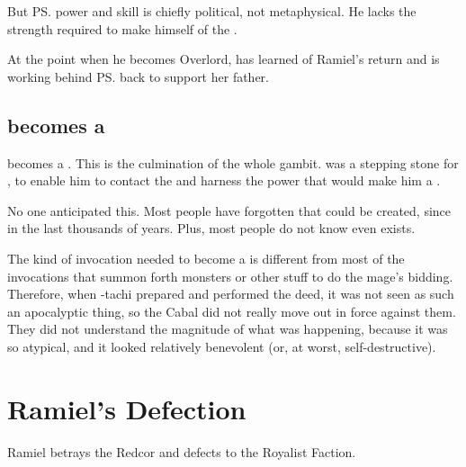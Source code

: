 \begin{garbage}
But \ps{\Dasteron} power and skill is chiefly political, not metaphysical. 
He lacks the \vertex{} strength required to make himself \apex{} of the \Mystraacht{} \matrix. 

At the point when he becomes Overlord, \Cishiel{} has learned of Ramiel's return and is working behind \ps{\Dasteron} back to support her father. 









\subsection{\Vizsherioch{} becomes a \shaeeroth}
\Vizsherioch{} becomes a \shaeeroth.
This is the culmination of the whole \Nithdornazsh{} gambit. 
\Nithdornazsh{} was a stepping stone for \Vizsherioch, to enable him to contact the \xss{} and harness the power that would make him a \shaeeroth.

No one anticipated this. 
Most people have forgotten that \shaeeroth{} could be created, since  in the last thousands of years. 
Plus, most people do not know \Vizsherioch{} even exists. 

The kind of invocation needed to become a \shaeeroth{} is different from most of the invocations that summon forth monsters or other stuff to do the mage's bidding. 
Therefore, when \Vizsherioch-tachi prepared and performed the deed, it was not seen as such an apocalyptic thing, so the Cabal did not really move out in force against them. 
They did not understand the magnitude of what was happening, because it was so atypical, and it looked relatively benevolent (or, at worst, self-destructive). 















\section{Ramiel's Defection}
Ramiel betrays the Redcor and defects to the Royalist Faction. 








\end{garbage}
